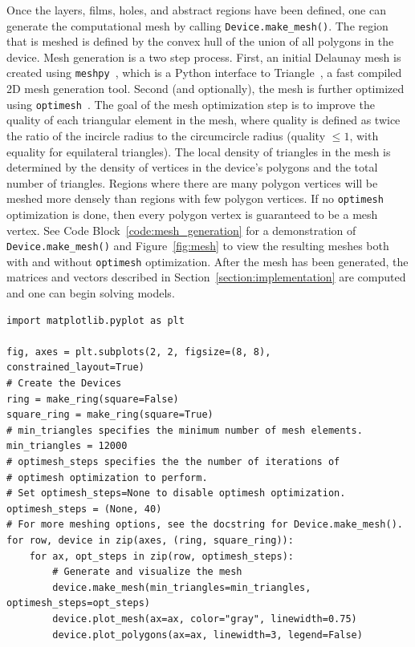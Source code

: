 \documentclass[final,3p,times]{elsarticle}
\newcommand{\inline}[1]{\texttt{#1}\xspace}
\newenvironment{code}{\captionsetup{type=listing}}{\hfill}
\begin{document}
Once the layers, films, holes, and abstract regions have been defined, one can generate the computational mesh by calling \inline{Device.make_mesh()}. The region that is meshed is defined by the convex hull of the union of all polygons in the device. Mesh generation is a two step process. First, an initial Delaunay mesh is created using \inline{meshpy}~\cite{Klockner}, which is a Python interface to Triangle~\cite{shewchuk96b, Shewchuk}, a fast compiled 2D mesh generation tool. Second (and optionally), the mesh is further optimized using \inline{optimesh}~\cite{nico_schlomer_adam_dobrawy_2021}. The goal of the mesh optimization step is to improve the quality of each triangular element in the mesh, where quality is defined as twice the ratio of the incircle radius to the circumcircle radius (quality $\leq1$, with equality for equilateral triangles). The local density of triangles in the mesh is determined by the density of vertices in the device's polygons and the total number of triangles. Regions where there are many polygon vertices will be meshed more densely than regions with few polygon vertices. If no \inline{optimesh} optimization is done, then every polygon vertex is guaranteed to be a mesh vertex. See Code Block~\ref{code:mesh_generation} for a demonstration of \inline{Device.make_mesh()} and Figure~\ref{fig:mesh} to view the resulting meshes both with and without \inline{optimesh} optimization. After the mesh has been generated, the matrices and vectors described in Section~\ref{section:implementation} are computed and one can begin solving models.

\begin{code}
\begin{verbatim}
import matplotlib.pyplot as plt

fig, axes = plt.subplots(2, 2, figsize=(8, 8), constrained_layout=True)
# Create the Devices
ring = make_ring(square=False)
square_ring = make_ring(square=True)
# min_triangles specifies the minimum number of mesh elements.
min_triangles = 12000
# optimesh_steps specifies the the number of iterations of
# optimesh optimization to perform.
# Set optimesh_steps=None to disable optimesh optimization.
optimesh_steps = (None, 40)
# For more meshing options, see the docstring for Device.make_mesh().
for row, device in zip(axes, (ring, square_ring)):
    for ax, opt_steps in zip(row, optimesh_steps):
        # Generate and visualize the mesh
        device.make_mesh(min_triangles=min_triangles, optimesh_steps=opt_steps)
        device.plot_mesh(ax=ax, color="gray", linewidth=0.75)
        device.plot_polygons(ax=ax, linewidth=3, legend=False)
\end{verbatim}
\label{code:mesh_generation}
\end{code}
\end{document}
